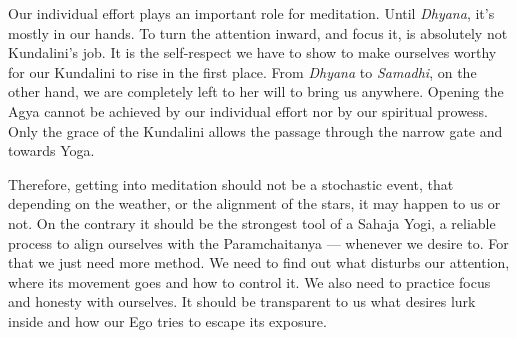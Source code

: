 \documentclass[12pt]{article}
\begin{document}


Our individual effort plays an important role for meditation.
Until \textit{Dhyana}, it's mostly in our hands.
To turn the attention inward, and focus it, is absolutely not Kundalini's job.
It is the self-respect we have to show to make ourselves worthy for our Kundalini to rise in the first place.
From \textit{Dhyana} to \textit{Samadhi}, on the other hand, we are completely left to her will to bring us anywhere.
Opening the Agya cannot be achieved by our individual effort nor by our spiritual prowess.
Only the grace of the Kundalini allows the passage through the narrow gate and towards Yoga.

Therefore, getting into meditation should not be a stochastic event, that depending on the weather, or the alignment of the stars, it may happen to us or not.
On the contrary it should be the strongest tool of a Sahaja Yogi, a reliable process to align ourselves with the Paramchaitanya --- whenever we desire to.
For that we just need more method.
We need to find out what disturbs our attention, where its movement goes and how to control it.
We also need to practice focus and honesty with ourselves.
It should be transparent to us what desires lurk inside and how our Ego tries to escape its exposure.


\end{document}
